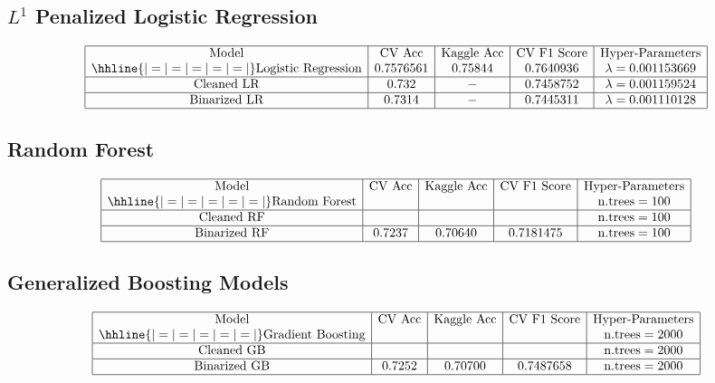 \documentclass{article}
\begin{document}
\subsection{$L^1$ Penalized Logistic Regression}
$$\begin{array}{|c|c|c|c|c|}
\hline
\text{Model} & \text{CV Acc} & \text{Kaggle Acc} & \text{CV F1 Score} & \text{Hyper-Parameters} \\
\hhline{|=|=|=|=|=|}
\text{Logistic Regression} & 0.7576561 & 0.75844 & 0.7640936 & \lambda = 0.001153669\\
\hline
\text{Cleaned LR} & 0.732 & - & 0.7458752 & \lambda = 0.001159524 \\
\hline
\text{Binarized LR} & 0.7314 & - & 0.7445311 & \lambda = 0.001110128 \\
\hline
\end{array}$$

\subsection{Random Forest}
$$\begin{array}{|c|c|c|c|c|}
\hline
\text{Model} & \text{CV Acc} & \text{Kaggle Acc} & \text{CV F1 Score} & \text{Hyper-Parameters}   \\
\hhline{|=|=|=|=|=|}
\text{Random Forest} &  &  &  & \text{n.trees} = 100 \\
\hline
\text{Cleaned RF} &  &  &  & \text{n.trees} = 100 \\
\hline
\text{Binarized RF} & 0.7237 & 0.70640 & 0.7181475 & \text{n.trees} = 100 \\
\hline
\end{array}$$

\subsection{Generalized Boosting Models}
$$\begin{array}{|c|c|c|c|c|}
\hline
\text{Model} & \text{CV Acc} & \text{Kaggle Acc} & \text{CV F1 Score} & \text{Hyper-Parameters} \\
\hhline{|=|=|=|=|=|}
\text{Gradient Boosting} &  &  &  & \text{n.trees} = 2000 \\
\hline
\text{Cleaned GB} &  &  &  & \text{n.trees} = 2000 \\
\hline
\text{Binarized GB} & 0.7252 & 0.70700 & 0.7487658 & \text{n.trees} = 2000 \\
\hline
\end{array}$$
\end{document}

